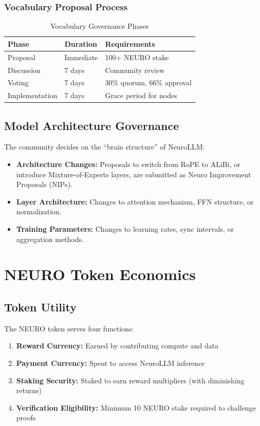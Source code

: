 \documentclass[11pt,a4paper]{article}
\begin{document}
\subsubsection{Vocabulary Proposal Process}
\begin{table}[H]
\centering
\caption{Vocabulary Governance Phases}
\begin{tabular}{@{}lll@{}}
\toprule
\textbf{Phase} & \textbf{Duration} & \textbf{Requirements} \\
\midrule
Proposal & Immediate & 100+ NEURO stake \\
Discussion & 7 days & Community review \\
Voting & 7 days & 30\% quorum, 66\% approval \\
Implementation & 7 days & Grace period for nodes \\
\bottomrule
\end{tabular}
\end{table}

\subsection{Model Architecture Governance}
The community decides on the ``brain structure'' of NeuroLLM:
\begin{itemize}
    \item \textbf{Architecture Changes:} Proposals to switch from RoPE to ALiBi, or introduce Mixture-of-Experts layers, are submitted as Neuro Improvement Proposals (NIPs).
    \item \textbf{Layer Architecture:} Changes to attention mechanism, FFN structure, or normalization.
    \item \textbf{Training Parameters:} Changes to learning rates, sync intervals, or aggregation methods.
\end{itemize}

\section{NEURO Token Economics}

\subsection{Token Utility}

The NEURO token serves four functions:

\begin{enumerate}
    \item \textbf{Reward Currency:} Earned by contributing compute and data
    \item \textbf{Payment Currency:} Spent to access NeuroLLM inference
    \item \textbf{Staking Security:} Staked to earn reward multipliers (with diminishing returns)
    \item \textbf{Verification Eligibility:} Minimum 10 NEURO stake required to challenge proofs
\end{enumerate}
\end{document}

